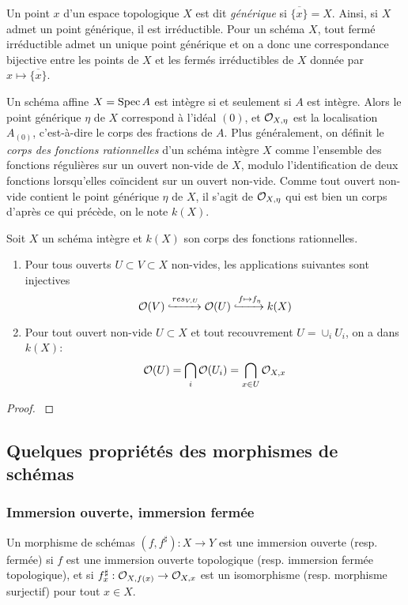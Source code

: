 Un point $x$ d'un espace topologique $X$ est dit \textit{générique} si $\overline{\lbrace x\rbrace}=X$. Ainsi, si $X$ admet un point générique, il est irréductible. Pour un schéma $X$, tout fermé irréductible admet un unique point générique et on a donc une correspondance bijective entre les points de $X$ et les fermés irréductibles de $X$ donnée par $x\mapsto \overline{\lbrace x\rbrace}$. 

Un schéma affine $X=\operatorname{Spec} A$ est intègre si et seulement si $A$ est intègre. Alors le point générique $\eta$ de $X$ correspond à l'idéal $(0)$, et $\mathcal{O}_{X,\eta}$ est la localisation $A_{(0)}$, c'est-à-dire le corps des fractions de $A$. Plus généralement, on définit le \textit{corps des fonctions rationnelles} d'un schéma intègre $X$ comme l'ensemble des fonctions régulières sur un ouvert non-vide de $X$, modulo l'identification de deux fonctions lorsqu'elles coïncident sur un ouvert non-vide. Comme tout ouvert non-vide contient le point générique $\eta$ de $X$, il s'agit de $\mathcal{O}_{X,\eta}$ qui est bien un corps d'après ce qui précède, on le note $k(X)$.

\begin{prop}
Soit $X$ un schéma intègre et $k(X)$ son corps des fonctions rationnelles. 
\begin{enumerate}
\item Pour tous ouverts $U\subset V\subset X$ non-vides, les applications suivantes sont injectives
$$\mathcal{O}(V)\xhookrightarrow{res_{V,U}}\mathcal{O}(U)\xhookrightarrow{f\mapsto f_\eta} k(X)$$
\item Pour tout ouvert non-vide $U\subset X$ et tout recouvrement $U=\cup_i U_i$, on a dans $k(X)$:
$$\mathcal{O}(U)=\bigcap_i \mathcal{O}(U_i)=\bigcap_{x\in U}\mathcal{O}_{X,x}$$
\end{enumerate}
\end{prop}
\begin{proof}
\cite[3.29]{Gortz}
\end{proof}

\subsection{Quelques propriétés des morphismes de schémas}

\subsubsection{Immersion ouverte, immersion fermée}

\begin{defn}
Un morphisme de schémas $(f,f^\sharp):X\rightarrow Y$ est une immersion ouverte (resp. fermée) si $f$ est une immersion ouverte topologique (resp. immersion fermée topologique), et si $f^\sharp_x:\mathcal{O}_{X,f(x)}\rightarrow \mathcal{O}_{X,x}$ est un isomorphisme (resp. morphisme surjectif) pour tout $x\in X$.
\end{defn}

